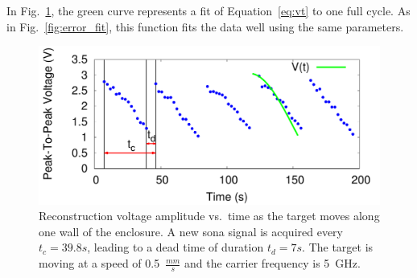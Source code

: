 In Fig.~\ref{fig:moving_recon}, the green curve represents a fit of
Equation~\ref{eq:vt} to one full cycle. As in Fig.~\ref{fig:error_fit}, this
function fits the data well using the same parameters.



\begin{figure}[t]
\centering
\includegraphics[width=\columnwidth]{figs/moving_recon.pdf}
\caption{Reconstruction voltage amplitude vs.\ time as the target moves along
one wall of the enclosure. A new sona signal is acquired every $t_{c}=39.8s$,
leading to a dead time of duration $t_{d}=7s$. The target is moving at a speed
of 0.5~$\frac{mm}{s}$ and the carrier frequency is 5~GHz.}
\label{fig:moving_recon}
\end{figure}
